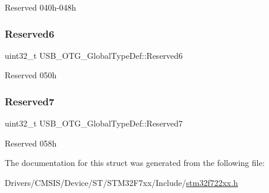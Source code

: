 Reserved 040h-\/048h \mbox{\label{struct_u_s_b___o_t_g___global_type_def_a4a273db791acbfdf89594c9d4005e7e1}} 
\subsubsection{\texorpdfstring{Reserved6}{Reserved6}}
{\footnotesize\ttfamily uint32\+\_\+t U\+S\+B\+\_\+\+O\+T\+G\+\_\+\+Global\+Type\+Def\+::\+Reserved6}

Reserved 050h \mbox{\label{struct_u_s_b___o_t_g___global_type_def_a524dfaf02dcdb458b7d36c9af28d537d}} 
\subsubsection{\texorpdfstring{Reserved7}{Reserved7}}
{\footnotesize\ttfamily uint32\+\_\+t U\+S\+B\+\_\+\+O\+T\+G\+\_\+\+Global\+Type\+Def\+::\+Reserved7}

Reserved 058h 

The documentation for this struct was generated from the following file\+:\begin{DoxyCompactItemize}
\item 
Drivers/\+C\+M\+S\+I\+S/\+Device/\+S\+T/\+S\+T\+M32\+F7xx/\+Include/\mbox{\hyperlink{stm32f722xx_8h}{stm32f722xx.\+h}}\end{DoxyCompactItemize}
